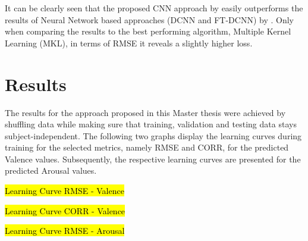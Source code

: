 It can be clearly seen that the proposed CNN approach by \citet{Handrich:2020:SimultaneousPredVA} easily outperforms the results of Neural Network based approaches (DCNN and FT-DCNN) by \citet{Kossaifi:2017:AFEW-VADatabase}. Only when comparing the results to the best performing algorithm, Multiple Kernel Learning (MKL), in terms of RMSE it reveals a slightly higher loss.



\section{Results}
The results for the approach proposed in this Master thesis were achieved by shuffling data while making sure that training, validation and testing data stays subject-independent. 
\newline\newline
The following two graphs display the learning curves during training for the selected metrics, namely RMSE and CORR, for the predicted Valence values. Subsequently, the respective learning curves are presented for the predicted Arousal values.

\hl{Learning Curve RMSE - Valence}


\hl{Learning Curve CORR - Valence}


\hl{Learning Curve RMSE - Arousal}

